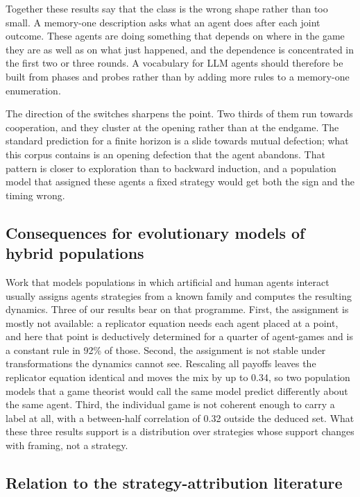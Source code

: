 \documentclass[11pt,a4paper]{article}
\begin{document}
Together these results say that the class is the wrong shape rather than too
small. A memory-one description asks what an agent does after each joint
outcome. These agents are doing something that depends on where in the game
they are as well as on what just happened, and the dependence is concentrated
in the first two or three rounds. A vocabulary for LLM agents should therefore
be built from phases and probes rather than by adding more rules to a
memory-one enumeration.

The direction of the switches sharpens the point. Two thirds of them run
towards cooperation, and they cluster at the opening rather than at the
endgame. The standard prediction for a finite horizon is a slide towards
mutual defection; what this corpus contains is an opening defection that the
agent abandons. That pattern is closer to exploration than to backward
induction, and a population model that assigned these agents a fixed strategy
would get both the sign and the timing wrong.

\subsection{Consequences for evolutionary models of hybrid populations}

Work that models populations in which artificial and human agents
interact~\citep{paiva2018engineering,santos2018social,dafoe2021cooperative}
usually assigns agents strategies from a known family and computes the
resulting dynamics. Three of our results bear on that programme. First, the
assignment is mostly not available: a replicator equation needs each agent
placed at a point, and here that point is deductively determined for a quarter
of agent-games and is a constant rule in 92\% of those. Second, the assignment
is not stable under transformations the dynamics cannot see. Rescaling all
payoffs leaves the replicator equation identical and moves the mix by up to
0.34, so two population models that a game theorist would call the same model
predict differently about the same agent. Third, the individual game is not
coherent enough to carry a label at all, with a between-half correlation of
0.32 outside the deduced set. What these three results support is a
distribution over strategies whose support changes with framing, not a
strategy.

\subsection{Relation to the strategy-attribution literature}
\end{document}
